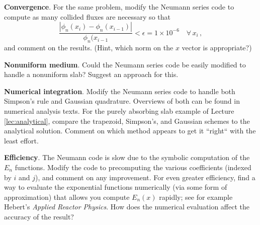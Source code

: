 \begin{exercises}
  \item \textbf{Convergence}. For the same problem, modify the Neumann series code to compute as many collided fluxes are necessary so that
  \begin{equation*}
   \frac{|\phi_n(x_i)-\phi_n(x_{i-1})|}{\phi_n(x_{i-1}} < \epsilon = 1\times10^{-6} \, \, \, \, \, \, \forall \, x_i \, ,
  \end{equation*}
   and comment on the results. (Hint, which norm on the $x$ vector is appropriate?)
  
  \item \textbf{Nonuniform medium}. Could the Neumann series code be easily modified to handle a nonuniform slab?  Suggest an approach for this.

  \item \textbf{Numerical integration}. Modify the Neumann series code to handle both Simpson's rule and Gaussian quadrature.  Overviews of both can be found in numerical analysis texts.  For the purely absorbing slab example of Lecture \ref{lec:analytical}, compare the trapezoid, Simpson's, and Gaussian schemes to the analytical solution.  Comment on which method appears to get it ``right`` with the least effort.

  \item \textbf{Efficiency}.  The Neumann code is slow due to the symbolic computation of the $E_n$ functions. Modify the code to precomputing the various coefficients (indexed by $i$ and $j$), and comment on any improvement.  For even greater efficiency, find a way to evaluate the exponential functions numerically (via some form of approximation) that allows you compute $E_n(x)$ rapidly; see for example Hebert's \textit{Applied Reactor Physics}.  How does the numerical evaluation affect the accuracy of the result?


\end{exercises}
